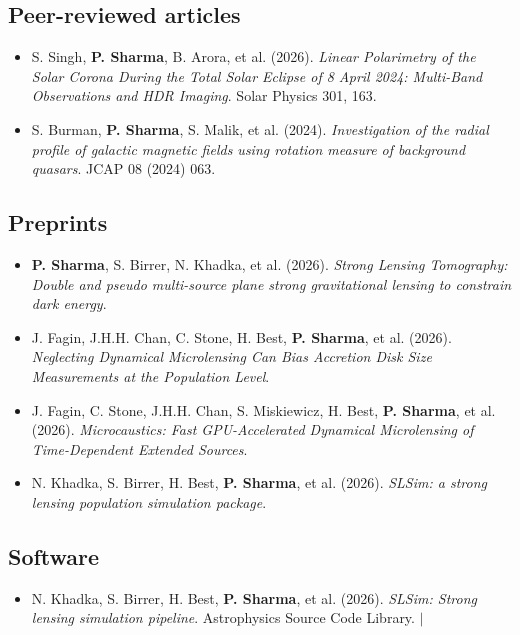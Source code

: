 \subsection*{Peer-reviewed articles}
\begin{itemize}[leftmargin=0.15in, label={}, itemsep=2pt]
  \item S. Singh, \textbf{P. Sharma}, B. Arora, et al. (2026). \emph{Linear Polarimetry of the Solar Corona During the Total Solar Eclipse of 8 April 2024: Multi-Band Observations and HDR Imaging}. Solar Physics 301, 163. 
  \item S. Burman, \textbf{P. Sharma}, S. Malik, et al. (2024). \emph{Investigation of the radial profile of galactic magnetic fields using rotation measure of background quasars}. JCAP 08 (2024) 063. 
\end{itemize}
\subsection*{Preprints}
\begin{itemize}[leftmargin=0.15in, label={}, itemsep=2pt]
  \item \textbf{P. Sharma}, S. Birrer, N. Khadka, et al. (2026). \emph{Strong Lensing Tomography: Double and pseudo multi-source plane strong gravitational lensing to constrain dark energy}. 
  \item J. Fagin, J.H.H. Chan, C. Stone, H. Best, \textbf{P. Sharma}, et al. (2026). \emph{Neglecting Dynamical Microlensing Can Bias Accretion Disk Size Measurements at the Population Level}. 
  \item J. Fagin, C. Stone, J.H.H. Chan, S. Miskiewicz, H. Best, \textbf{P. Sharma}, et al. (2026). \emph{Microcaustics: Fast GPU-Accelerated Dynamical Microlensing of Time-Dependent Extended Sources}. 
  \item N. Khadka, S. Birrer, H. Best, \textbf{P. Sharma}, et al. (2026). \emph{SLSim: a strong lensing population simulation package}. 
\end{itemize}
\subsection*{Software}
\begin{itemize}[leftmargin=0.15in, label={}, itemsep=2pt]
  \item N. Khadka, S. Birrer, H. Best, \textbf{P. Sharma}, et al. (2026). \emph{SLSim: Strong lensing simulation pipeline}. Astrophysics Source Code Library.  $|$ 
\end{itemize}
